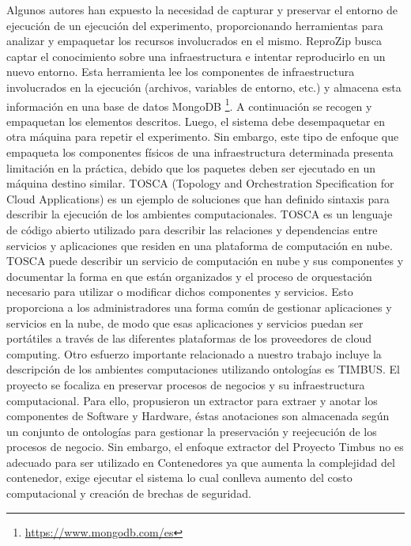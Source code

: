 Algunos autores han expuesto la necesidad de capturar y preservar el entorno de ejecución de un ejecución del experimento, proporcionando herramientas para analizar y empaquetar los recursos involucrados en el mismo.
ReproZip \cite{DBLP:conf/tapp/ChirigatiSF13} busca captar el conocimiento sobre una infraestructura e intentar reproducirlo en un nuevo entorno. Esta herramienta lee los componentes de infraestructura involucrados en la ejecución (archivos, variables de entorno, etc.) y almacena esta información en una base de datos MongoDB \footnote{\url{https://www.mongodb.com/es}}. A continuación se recogen y empaquetan los elementos descritos. Luego, el sistema debe desempaquetar en otra máquina para repetir el experimento. Sin embargo, este tipo de enfoque que empaqueta los componentes físicos de una infraestructura determinada presenta limitación en la práctica, debido que los paquetes deben ser ejecutado en un máquina destino similar.
TOSCA (Topology and Orchestration Specification for Cloud Applications) es un ejemplo de soluciones que han definido sintaxis para describir la ejecución de los ambientes computacionales. TOSCA es un lenguaje de código abierto utilizado para describir las relaciones y dependencias entre servicios y aplicaciones que residen en una plataforma de computación en nube. TOSCA puede describir un servicio de computación en nube y sus componentes y documentar la forma en que están organizados y el proceso de orquestación necesario para utilizar o modificar dichos componentes y servicios. Esto proporciona a los administradores una forma común de gestionar aplicaciones y servicios en la nube, de modo que esas aplicaciones y servicios puedan ser portátiles a través de las diferentes plataformas de los proveedores de cloud computing. 
Otro esfuerzo importante relacionado a nuestro trabajo incluye la descripción de los ambientes computaciones utilizando ontologías es TIMBUS. El proyecto se focaliza en preservar procesos de negocios y su infraestructura computacional.  Para ello, propusieron un extractor para extraer y anotar los componentes de Software y Hardware, éstas anotaciones son almacenada según un conjunto de ontologías  para gestionar la preservación y reejecución de los procesos de negocio. Sin embargo, el enfoque extractor del Proyecto Timbus no es adecuado para ser utilizado en Contenedores ya que aumenta la complejidad del contenedor, exige ejecutar el sistema lo cual conlleva aumento del costo computacional y creación de brechas de seguridad. 


